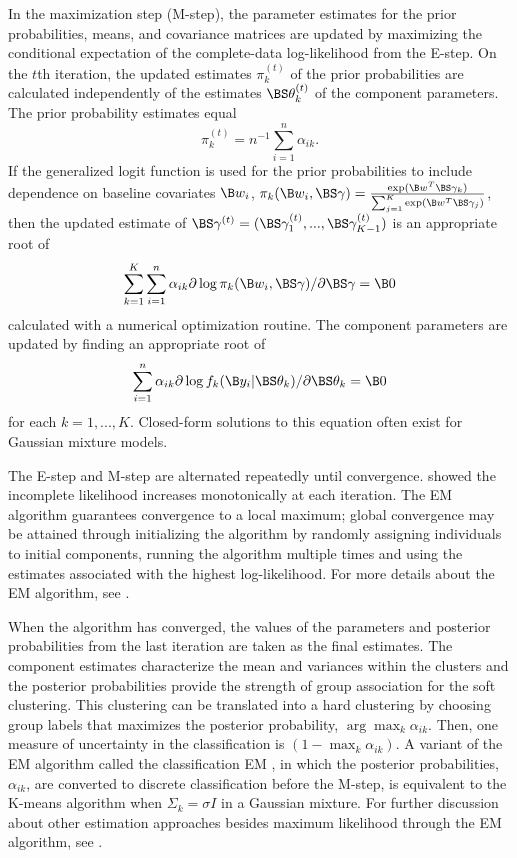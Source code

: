 In the maximization step (M-step), the parameter estimates for the prior probabilities, means, and covariance matrices are updated by maximizing the conditional expectation of the complete-data log-likelihood from the E-step. On the $t$th iteration, the updated estimates $\pi_{k}^{(t)}$ of the prior probabilities are calculated independently of the estimates $\BS\theta_{k}^{(t)}$ of the component parameters. The prior probability estimates equal 
$$\pi_{k}^{(t)}=n^{-1}\sum^{n}_{i=1}\alpha_{ik}.$$
If the generalized logit function is used for the prior probabilities to include dependence on baseline covariates $\B w_{i}$, $\pi_{k}(\B w_{i},\BS\gamma) = \frac{\exp(\B w^T \BS \gamma_k) }{\sum_{j=1}^K \exp(\B w^T \BS \gamma_j)}$, then the updated estimate of $\BS\gamma^{(t)}=(\BS\gamma_{1}^{(t)},...,\BS\gamma_{K-1}^{(t)})$ is an appropriate root of 
$$\sum^{K}_{k=1}\sum^{n}_{i=1}\alpha_{ik}\partial\log \pi_{k}(\B w_{i},\BS\gamma)/\partial \BS\gamma = \B 0$$
calculated with a numerical optimization routine. The component parameters are updated by finding an appropriate root of 
$$\sum^{n}_{i=1}\alpha_{ik}\partial\log f_{k}(\B y_{i}|\BS\theta_k) /\partial \BS\theta_{k} =\B 0$$
for each $k=1,...,K$. Closed-form solutions to this equation often exist for Gaussian mixture models.  

The E-step and M-step are alternated repeatedly until convergence. \Textcite{dempster1977} showed the incomplete likelihood increases monotonically at each iteration. The EM algorithm guarantees convergence to a local maximum; global convergence may be attained through initializing the algorithm by randomly assigning individuals to initial components, running the algorithm multiple times and using the estimates associated with the highest log-likelihood. For more details about the EM algorithm, see \textcite{mclachlan1997}. 

When the algorithm has converged, the values of the parameters and posterior probabilities from the last iteration are taken as the final estimates. The component estimates characterize the mean and variances within the clusters and the posterior probabilities provide the strength of group association for the soft clustering. This clustering can be translated into a hard clustering by choosing group labels that maximizes the posterior probability, $\arg\max_k \alpha_{ik}$. Then, one measure of uncertainty in the classification is $(1-\max_k\alpha_{ik}).$ A variant of the EM algorithm called the classification EM \cite{celeux1992}, in which the posterior probabilities, $\alpha_{ik}$, are converted to discrete classification before the M-step, is equivalent to the K-means algorithm when $\Sigma_{k} =\sigma I$ in a Gaussian mixture. For further discussion about other estimation approaches besides maximum likelihood through the EM algorithm, see \textcite{mclachlan2000}.

